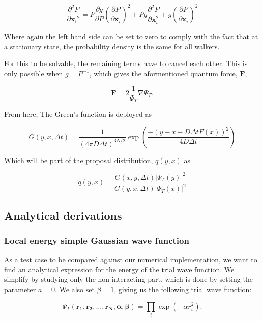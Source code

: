 \documentclass[
]{article}
\begin{document}
\[ \frac{\partial^{2} P}{\partial \mathbf{x} _{\mathbf{i}}{}^{2}}=P \frac{\partial g}{\partial P}\left(\frac{\partial P}{\partial \mathbf{x}_{i}}\right)^{2}+P g \frac{\partial^{2} P}{\partial \mathbf{x}_{i}^{2}}+g\left(\frac{\partial P}{\partial \mathbf{x}_{i}}\right)^{2} \]

Where again the left hand side can be set to zero to comply with the
fact that at a stationary state, the probability density is the same for
all walkers.

For this to be solvable, the remaining terms have to cancel each other.
This is only possible when \(g = P^{-1}\), which gives the aformentioned
quantum force, \(\mathbf{F},\)

\[ \mathbf{F}=2 \frac{1}{\Psi_{T}} \nabla \Psi_{T}. \]

From here, The Green's function is deployed as

\[ G(y, x, \Delta t)=\frac{1}{(4 \pi D \Delta t)^{3 N / 2}} \exp \left(\frac{-(y-x-D \Delta t F(x))^{2}}{ 4 D \Delta t}\right) \]

Which will be part of the proposal distribution, \(q(y,x)\) as

\begin{equation} q(y, x)=\frac{G(x, y, \Delta t)\left|\Psi_{T}(y)\right|^{2}}{G(y, x, \Delta t)\left|\Psi_{T}(x)\right|^{2}}\label{eq:proposal_distr}\end{equation}

\hypertarget{analytical-derivations}{%
\subsection{Analytical derivations}\label{analytical-derivations}}

\hypertarget{local-energy-simple-gaussian-wave-function}{%
\subsubsection{Local energy simple Gaussian wave
function}\label{local-energy-simple-gaussian-wave-function}}

As a test case to be compared against our numerical implementation, we
want to find an analytical expression for the energy of the trial wave
function. We simplify by studying only the non-interacting part, which
is done by setting the parameter \(a = 0\). We also set \(\beta = 1\),
giving us the following trial wave function:

\[\Psi_T(\mathbf{r_1, r_2,\ldots,r_N, \alpha, \beta}) = \prod_i \exp(-\alpha r_{i}^2).\]
\end{document}
